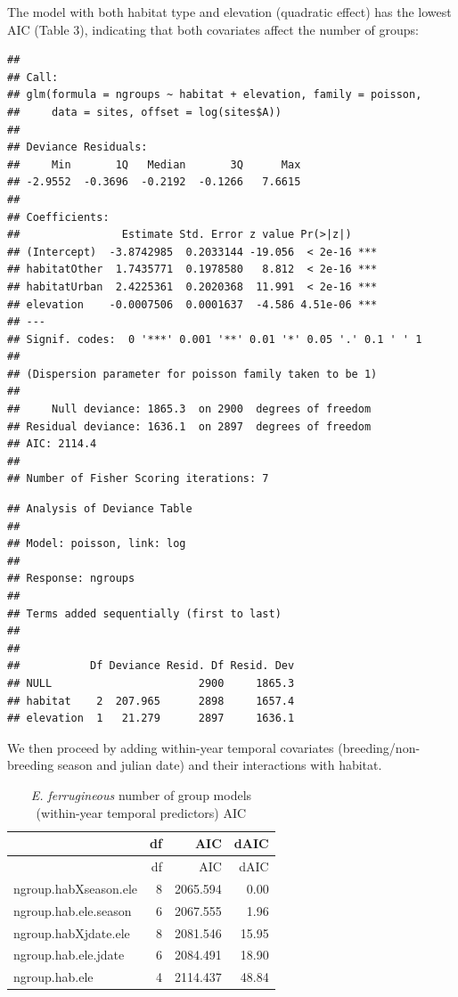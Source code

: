 \documentclass[]{article}
\begin{document}
\hfill\break

The model with both habitat type and elevation (quadratic effect) has
the lowest AIC (Table 3), indicating that both covariates affect the
number of groups:

\begin{verbatim}
## 
## Call:
## glm(formula = ngroups ~ habitat + elevation, family = poisson, 
##     data = sites, offset = log(sites$A))
## 
## Deviance Residuals: 
##     Min       1Q   Median       3Q      Max  
## -2.9552  -0.3696  -0.2192  -0.1266   7.6615  
## 
## Coefficients:
##                Estimate Std. Error z value Pr(>|z|)    
## (Intercept)  -3.8742985  0.2033144 -19.056  < 2e-16 ***
## habitatOther  1.7435771  0.1978580   8.812  < 2e-16 ***
## habitatUrban  2.4225361  0.2020368  11.991  < 2e-16 ***
## elevation    -0.0007506  0.0001637  -4.586 4.51e-06 ***
## ---
## Signif. codes:  0 '***' 0.001 '**' 0.01 '*' 0.05 '.' 0.1 ' ' 1
## 
## (Dispersion parameter for poisson family taken to be 1)
## 
##     Null deviance: 1865.3  on 2900  degrees of freedom
## Residual deviance: 1636.1  on 2897  degrees of freedom
## AIC: 2114.4
## 
## Number of Fisher Scoring iterations: 7
\end{verbatim}

\begin{verbatim}
## Analysis of Deviance Table
## 
## Model: poisson, link: log
## 
## Response: ngroups
## 
## Terms added sequentially (first to last)
## 
## 
##           Df Deviance Resid. Df Resid. Dev
## NULL                       2900     1865.3
## habitat    2  207.965      2898     1657.4
## elevation  1   21.279      2897     1636.1
\end{verbatim}

We then proceed by adding within-year temporal covariates
(breeding/non-breeding season and julian date) and their interactions
with habitat.

\begin{longtable}[]{@{}lrrr@{}}
\caption{\textit{E. ferrugineous} number of group models (within-year
temporal predictors) AIC}\tabularnewline
\toprule
& df & AIC & dAIC\tabularnewline
\midrule
\endfirsthead
\toprule
& df & AIC & dAIC\tabularnewline
\midrule
\endhead
ngroup.habXseason.ele & 8 & 2065.594 & 0.00\tabularnewline
ngroup.hab.ele.season & 6 & 2067.555 & 1.96\tabularnewline
ngroup.habXjdate.ele & 8 & 2081.546 & 15.95\tabularnewline
ngroup.hab.ele.jdate & 6 & 2084.491 & 18.90\tabularnewline
ngroup.hab.ele & 4 & 2114.437 & 48.84\tabularnewline
\bottomrule
\end{longtable}
\end{document}
